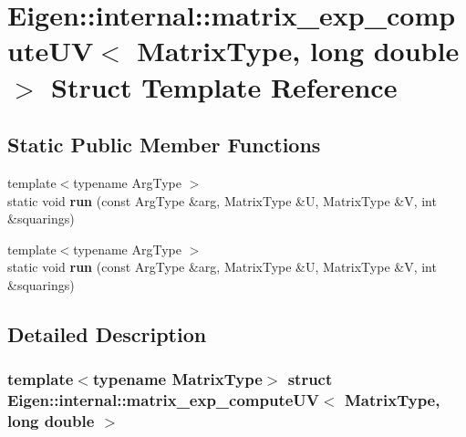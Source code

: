 \hypertarget{struct_eigen_1_1internal_1_1matrix__exp__compute_u_v_3_01_matrix_type_00_01long_01double_01_4}{}\section{Eigen\+:\+:internal\+:\+:matrix\+\_\+exp\+\_\+compute\+UV$<$ Matrix\+Type, long double $>$ Struct Template Reference}
\label{struct_eigen_1_1internal_1_1matrix__exp__compute_u_v_3_01_matrix_type_00_01long_01double_01_4}
\subsection*{Static Public Member Functions}
\begin{DoxyCompactItemize}
\item 
\mbox{\label{struct_eigen_1_1internal_1_1matrix__exp__compute_u_v_3_01_matrix_type_00_01long_01double_01_4_a36060b67700b19b46324df82e6446347}} 
{\footnotesize template$<$typename Arg\+Type $>$ }\\static void {\bfseries run} (const Arg\+Type \&arg, Matrix\+Type \&U, Matrix\+Type \&V, int \&squarings)
\item 
\mbox{\label{struct_eigen_1_1internal_1_1matrix__exp__compute_u_v_3_01_matrix_type_00_01long_01double_01_4_a36060b67700b19b46324df82e6446347}} 
{\footnotesize template$<$typename Arg\+Type $>$ }\\static void {\bfseries run} (const Arg\+Type \&arg, Matrix\+Type \&U, Matrix\+Type \&V, int \&squarings)
\end{DoxyCompactItemize}


\subsection{Detailed Description}
\subsubsection*{template$<$typename Matrix\+Type$>$\newline
struct Eigen\+::internal\+::matrix\+\_\+exp\+\_\+compute\+U\+V$<$ Matrix\+Type, long double $>$}



